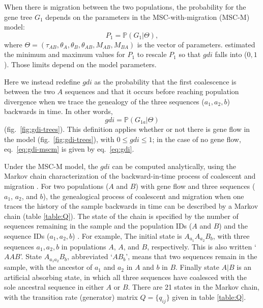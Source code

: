 \documentclass{article1}
\renewcommand{\P}{\mathbb{P}}
\begin{document}
When there is migration between the two populations, the probability for the gene tree
$G_1$ depends on the parameters in the MSC-with-migration (MSC-M) model:
\begin{equation} \label{eq:PG1}
    P_1 = \P(G_1 \bigl| \Theta) ,
\end{equation} 
where $\Theta = (\tau_{AB}, \theta_A, \theta_B, \theta_{AB}, M_{AB}, M_{BA})$ is the
vector of parameters.  \citet{Jackson2017} estimated the minimum and maximum values for
$P_1$ to rescale $P_1$ so that $gdi$ falls into ($0,1$).  Those limits depend on the
model parameters.

Here we instead redefine $gdi$ as the probability that the first coalescence is
between the two $A$ sequences and that it occurs before reaching population divergence
when we trace the genealogy of the three sequences ($a_1, a_2, b$) backwards in time.  In
other words,
\begin{equation} \label{eq:gdi-mscm}
   gdi = \P(G_{1a} \bigl| \Theta) 
\end{equation}
(fig.~\ref{fig:gdi-trees}).  This definition applies whether or not there is gene flow in
the model (fig.~\ref{fig:gdi-trees}), with $0 \le gdi \le 1$; in the case of no gene flow,
eq.~\ref{eq:gdi-mscm} is given by eq.~\ref{eq:gdi}.

Under the MSC-M model, the $gdi$ can be computed analytically, using the Markov
chain characterization of the backward-in-time process of coalescent and migration
\citep{Leache2019}.  For two populations ($A$ and $B$) with gene flow and three sequences
($a_1$, $a_2$, and $b$), the genealogical process of coalescent and migration when one
traces the history of the sample backwards in time can be described by a Markov chain
(table \ref{table:Q}).  The state of the chain is specified by the number of sequences
remaining in the sample and the population IDs ($A$ and $B$) and the sequence IDs ($a_1,
a_2, b$) \citep{Hobolth2011, Zhu2012, Jiao2021}.  For example, The initial state is
$A_{a_1}A_{a_2}B_b$, with three sequences $a_1, a_2, b$ in populations $A$, $A$, and $B$,
respectively.  This is also written `$AAB$'.  State $A_{a_1a_2}B_b$, abbreviated `$AB_b$',
means that two sequences remain in the sample, with the ancestor of $a_1$ and $a_2$ in $A$
and $b$ in $B$.  Finally state $A|B$ is an artificial absorbing state, in which all three
sequences have coalesced with the sole ancestral sequence in either $A$ or $B$.  There are
21 states in the Markov chain, with the transition rate (generator) matrix $Q =
\{q_{ij}\}$ given in table \ref{table:Q}.
\end{document}
